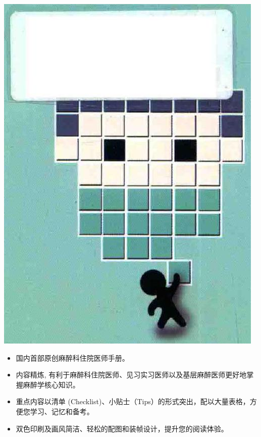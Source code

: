 \documentclass[10pt]{article}
\begin{document}
\begin{center}
\includegraphics[max width=\textwidth]{2024_07_05_645bb794a4d4f32ee0c8g-002}
\end{center}

\begin{itemize}
  \item 国内首部原创麻醉科住院医师手册。
  \item 内容精炼, 有利于麻醉科住院医师、见习实习医师以及基层麻醉医师更好地掌握麻醉学核心知识。
  \item 重点内容以清单 (Checklist)、小贴士（Tips）的形式突出，配以大量表格，方便您学习、记忆和备考。
  \item 双色印刷及画风简洁、轻松的配图和装帧设计，提升您的阅读体验。
\end{itemize}
\end{document}
